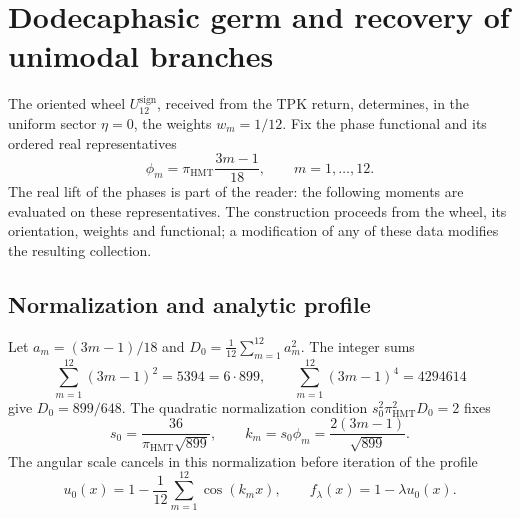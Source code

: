 \section{Dodecaphasic germ and recovery of unimodal branches}
\label{corpus9:iv:germen}

The oriented wheel \(U_{12}^{\mathrm{sign}}\), received from the
TPK return, determines, in the uniform sector \(\eta=0\),
the weights \(w_m=1/12\). Fix the phase functional and its ordered
real representatives
\begin{equation}
 \phi_m=\pi_{\mathrm{HMT}}\frac{3m-1}{18},
 \qquad m=1,\ldots,12.
 \label{corpus9:iv:germen-fases}
\end{equation}
The real lift of the phases is part of the reader:
the following moments are evaluated on these representatives.
The construction proceeds from the wheel, its orientation, weights
and functional; a modification of any of these data
modifies the resulting collection.

\subsection{Normalization and analytic profile}
Let \(a_m=(3m-1)/18\) and
\(D_0=\frac1{12}\sum_{m=1}^{12}a_m^2\). The integer sums
\[
 \sum_{m=1}^{12}(3m-1)^2=5394=6\cdot899,\qquad
 \sum_{m=1}^{12}(3m-1)^4=4294614
\]
give \(D_0=899/648\). The quadratic normalization condition
\(s_0^2\pi_{\mathrm{HMT}}^2D_0=2\) fixes
\[
 s_0=\frac{36}{\pi_{\mathrm{HMT}}\sqrt{899}},
 \qquad k_m=s_0\phi_m=\frac{2(3m-1)}{\sqrt{899}}.
\]
The angular scale cancels in this normalization before
iteration of the profile
\begin{equation}
 u_0(x)=1-\frac1{12}\sum_{m=1}^{12}\cos(k_mx),
 \qquad f_\lambda(x)=1-\lambda u_0(x).
 \label{corpus9:iv:germen-perfil}
\end{equation}

